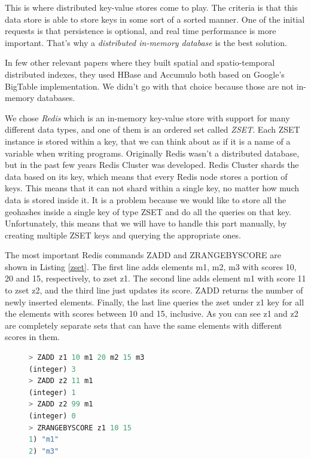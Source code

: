 \documentclass[times, utf8, diplomski]{fer}
\begin{document}
This is where distributed key-value stores come to play. The criteria is that this data store is able to store keys in some sort of a sorted manner. One of the initial requests is that persistence is optional, and real time performance is more important. That's why a \emph{distributed in-memory database} is the best solution.

In few other relevant papers where they built spatial \cite{spatialindex} and spatio-temporal \cite{spatiotemporal} distributed indexes, they used HBase and Accumulo both based on Google's BigTable implementation. We didn't go with that choice because those are not in-memory databases.

We chose \emph{Redis} which is an in-memory key-value store with support for many different data types, and one of them is an ordered set called \emph{ZSET}. Each ZSET instance is stored within a key, that we can think about as if it is a name of a variable when writing programs. Originally Redis wasn't a distributed database, but in the past few years Redis Cluster was developed. Redis Cluster shards the data based on its key, which means that every Redis node stores a portion of keys. This means that it can not shard within a single key, no matter how much data is stored inside it. It is a problem because we would like to store all the geohashes inside a single key of type ZSET and do all the queries on that key. Unfortunately, this means that we will have to handle this part manually, by creating multiple ZSET keys and querying the appropriate ones.

The most important Redis commands ZADD and ZRANGEBYSCORE are shown in Listing \ref{zset}. The first line adds elements m1, m2, m3 with scores 10, 20 and 15, respectively, to zset z1. The second line adds element m1 with score 11 to zset z2, and the third line just updates its score. ZADD returns the number of newly inserted elements. Finally, the last line queries the zset under z1 key for all the elements with scores between 10 and 15, inclusive. As you can see z1 and z2 are completely separate sets that can have the same elements with different scores in them.

\label{zset}
\begin{figure}[h]
\begin{lstlisting}[language=Python, caption=ZSET example, numbers=none, numberstyle=\footnotesize, stepnumber=1]
> ZADD z1 10 m1 20 m2 15 m3
(integer) 3
> ZADD z2 11 m1
(integer) 1
> ZADD z2 99 m1
(integer) 0
> ZRANGEBYSCORE z1 10 15
1) "m1"
2) "m3"
\end{lstlisting}
\end{figure}
\end{document}
